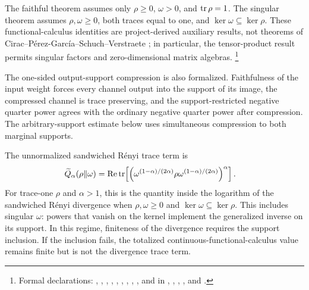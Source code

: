 \documentclass[11pt]{article}
\begin{document}
The faithful theorem assumes only $\rho\geq0$, $\omega>0$, and $\operatorname{tr}\rho=1$.
The singular theorem assumes $\rho,\omega\geq0$, both traces equal to one, and
$\ker\omega\subseteq\ker\rho$. These functional-calculus identities are
project-derived auxiliary results, not theorems of
Cirac--P\'erez-Garc\'ia--Schuch--Verstraete
\cite{Cirac2016MPDO_arXiv}; in particular, the tensor-product result permits
singular factors and zero-dimensional matrix algebras.
\footnote{Formal declarations:
,
,
,
,
,
,
,
,
,
and
 in
,
,
,
, and
.}

The one-sided output-support compression is also formalized. Faithfulness of
the input weight forces every channel output into the support of its image,
the compressed channel is trace preserving, and the support-restricted
negative quarter power agrees with the ordinary negative quarter power after
compression. The arbitrary-support estimate below uses simultaneous
compression to both marginal supports.

The unnormalized sandwiched R\'enyi trace term is
\begin{align}
    \widetilde Q_\alpha(\rho\Vert\omega)
        &=
        \operatorname{Re}\operatorname{tr}\!\left[\left(\omega^{(1-\alpha)/(2\alpha)}
                \rho
                \omega^{(1-\alpha)/(2\alpha)}\right)^\alpha\right].
    \label{eq:cpgsv17_sandwiched_renyi_trace}
\end{align}
For trace-one $\rho$ and $\alpha>1$, this is the quantity inside the logarithm
of the sandwiched R\'enyi divergence when $\rho,\omega\geq0$ and
$\ker\omega\subseteq\ker\rho$. This includes singular $\omega$: powers that
vanish on the kernel implement the generalized inverse on its support. In this
regime, finiteness of the divergence requires the support inclusion. If the
inclusion fails, the totalized continuous-functional-calculus value remains
finite but is not the divergence trace term.
\end{document}
